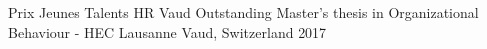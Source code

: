 

\begin{cvhonors}

  \cvhonor
    {Prix Jeunes Talents HR Vaud} %
    {Outstanding Master's thesis in Organizational Behaviour - HEC Lausanne} %
    {Vaud, Switzerland} %
    {2017} %

\end{cvhonors}
